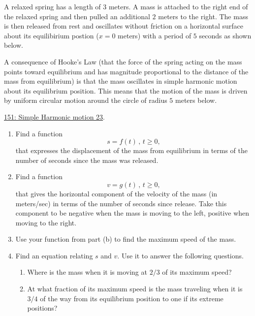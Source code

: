 \documentclass{ximera}
\begin{document}
\begin{question} \label{QODFIER33r3r}
A relaxed spring has a length of $3$ meters. A mass is attached to the right end of the relaxed spring and then pulled an additional $2$ meters to the right. The mass is then released from rest and oscillates without friction on a horizontal surface about its equilibirium postion ($x=0$ meters) with a period of $5$ seconds as shown below. 

A consequence of Hooke's Law (that the force of the spring acting on the mass points toward equilibrium and has magnitude proportional to the distance of the mass from equilibrium) is that the mass oscillates in simple harmonic motion about its equilibrium position.  This means that the motion of the mass is driven by uniform circular motion around the circle of radius $5$ meters below.

\href{https://www.desmos.com/calculator/noxooak1au}{151: Simple Harmonic motion 23}.

 
\begin{onlineOnly}
    \begin{center}
\end{center}
\end{onlineOnly}


\begin{enumerate}

\item Find a function
\[
     s = f(t) \, , \, t\geq 0, 
\]
that expresses the displacement of the mass from equilibrium in terms of the number of seconds since the mass was released.

\item Find a function 
\[
 v = g(t) \, , \, t\geq 0, 
\]
that gives the horizontal component of the velocity of the mass (in meters/sec) in terms of the number of seconds since release. Take this component to be negative when the mass is moving to the left, positive when moving to the right.

\item Use your function from part (b) to find the maximum speed of the mass.

\item Find an equation relating $s$ and $v$. Use it to answer the following questions.

\begin{enumerate}
\item Where is the mass when it is moving at $2/3$ of its maximum speed? 

\item At what fraction of its maximum speed is the mass traveling when it is $3/4$ of the way from its equilibrium position to one if its extreme positions?
\end{enumerate}

\end{enumerate}

\end{question}
\end{document}
